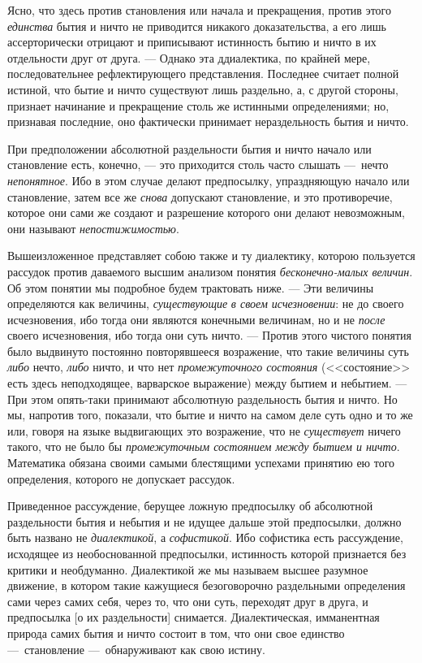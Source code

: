 Ясно, что здесь против становления или начала и прекращения, против этого
{\em единства} бытия и ничто не приводится никакого
доказательства, а его лишь ассерторически отрицают и приписывают истинность
бытию и ничто в их отдельности друг от друга. --- Однако эта ддиалектика, 
по крайней мере, последовательнее рефлектирующего представления. Последнее
считает полной истиной, что бытие и ничто существуют лишь раздельно, а, с
другой стороны, признает начинание и прекращение столь же истинными
определениями; но, признавая последние, оно фактически принимает
нераздельность бытия и ничто.

При предположении абсолютной раздельности бытия и ничто начало или
становление есть, конечно, --- это приходится столь часто слышать ---~нечто
{\em непонятное}. Ибо в этом случае делают предпосылку,
упраздняющую начало или становление, затем все же
{\em снова} допускают становление, и это противоречие,
которое они сами же создают и разрешение которого они делают невозможным,
они называют {\em непостижимостью}.

Вышеизложенное представляет собою также и ту диалектику, которою пользуется
рассудок против даваемого высшим анализом понятия
{\em бесконечно-малых величин}. Об этом понятии мы
подробное будем трактовать ниже. --- Эти величины определяются как величины,
{\em существующие} {\em в своем
исчезновении}: не до своего исчезновения, ибо тогда они являются конечными
величинам, но и не {\em после} своего исчезновения, ибо
тогда они суть ничто. --- Против этого чистого понятия было выдвинуто
постоянно повторявшееся возражение, что такие величины суть
{\em либо} нечто, {\em либо} ничто,
и что нет {\em промежуточного состояния} (<<состояние>>
есть здесь неподходящее, варварское выражение) между бытием и небытием. ---
При этом опять-таки принимают абсолютную раздельность бытия и ничто. Но мы,
напротив того, показали, что бытие и ничто на самом деле суть одно и то же
или, говоря на языке выдвигающих это возражение, что не
{\em существует} ничего такого, что не было бы
{\em промежуточным состоянием между бытием и ничто}.
Математика обязана своими самыми блестящими успехами принятию ею того
определения, которого не допускает рассудок.

Приведенное рассуждение, берущее ложную предпосылку об абсолютной
раздельности бытия и небытия и не идущее дальше этой предпосылки, должно
быть названо не {\em диалектикой}, а
{\em софистикой}. Ибо софистика есть рассуждение,
исходящее из необоснованной предпосылки, истинность которой признается без
критики и необдуманно. Диалектикой же мы называем высшее разумное движение,
в котором такие кажущиеся безоговорочно раздельными определения сами через
самих себя, через то, что они суть, переходят друг в друга, и предпосылка
[о их раздельности] снимается. Диалектическая, имманентная природа самих
бытия и ничто состоит в том, что они свое единство ---~становление
---~обнаруживают как свою истину.

